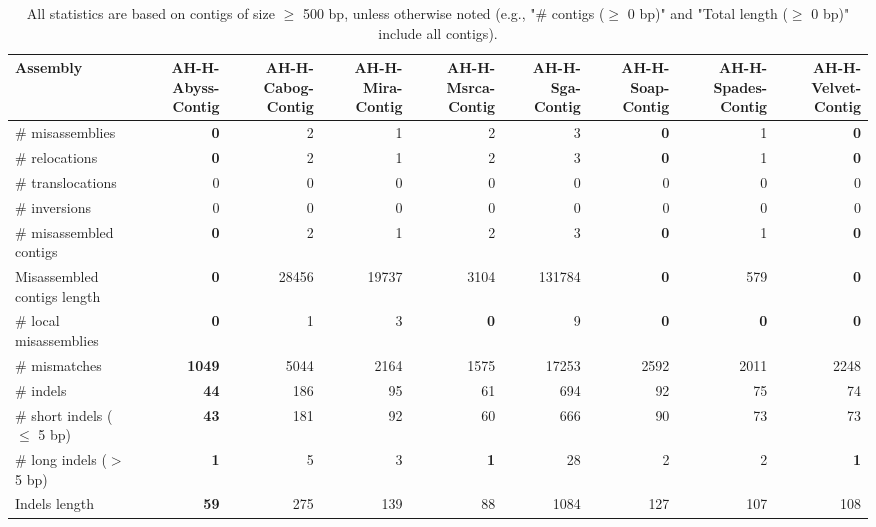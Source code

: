 \documentclass[12pt,a4paper]{article}
\begin{document}
\begin{table}[ht]
\begin{center}
\caption{All statistics are based on contigs of size $\geq$ 500 bp, unless otherwise noted (e.g., "\# contigs ($\geq$ 0 bp)" and "Total length ($\geq$ 0 bp)" include all contigs).}
\begin{tabular}{|l*{8}{|r}|}
\hline
Assembly & AH-H-Abyss-Contig & AH-H-Cabog-Contig & AH-H-Mira-Contig & AH-H-Msrca-Contig & AH-H-Sga-Contig & AH-H-Soap-Contig & AH-H-Spades-Contig & AH-H-Velvet-Contig \\ \hline
\# misassemblies & {\bf 0} & 2 & 1 & 2 & 3 & {\bf 0} & 1 & {\bf 0} \\ \hline
\hspace{5mm}\# relocations & {\bf 0} & 2 & 1 & 2 & 3 & {\bf 0} & 1 & {\bf 0} \\ \hline
\hspace{5mm}\# translocations & 0 & 0 & 0 & 0 & 0 & 0 & 0 & 0 \\ \hline
\hspace{5mm}\# inversions & 0 & 0 & 0 & 0 & 0 & 0 & 0 & 0 \\ \hline
\# misassembled contigs & {\bf 0} & 2 & 1 & 2 & 3 & {\bf 0} & 1 & {\bf 0} \\ \hline
Misassembled contigs length & {\bf 0} & 28456 & 19737 & 3104 & 131784 & {\bf 0} & 579 & {\bf 0} \\ \hline
\# local misassemblies & {\bf 0} & 1 & 3 & {\bf 0} & 9 & {\bf 0} & {\bf 0} & {\bf 0} \\ \hline
\# mismatches & {\bf 1049} & 5044 & 2164 & 1575 & 17253 & 2592 & 2011 & 2248 \\ \hline
\# indels & {\bf 44} & 186 & 95 & 61 & 694 & 92 & 75 & 74 \\ \hline
\hspace{5mm}\# short indels ($\leq$ 5 bp) & {\bf 43} & 181 & 92 & 60 & 666 & 90 & 73 & 73 \\ \hline
\hspace{5mm}\# long indels ($>$ 5 bp) & {\bf 1} & 5 & 3 & {\bf 1} & 28 & 2 & 2 & {\bf 1} \\ \hline
Indels length & {\bf 59} & 275 & 139 & 88 & 1084 & 127 & 107 & 108 \\ \hline
\end{tabular}
\end{center}
\end{table}
\end{document}
